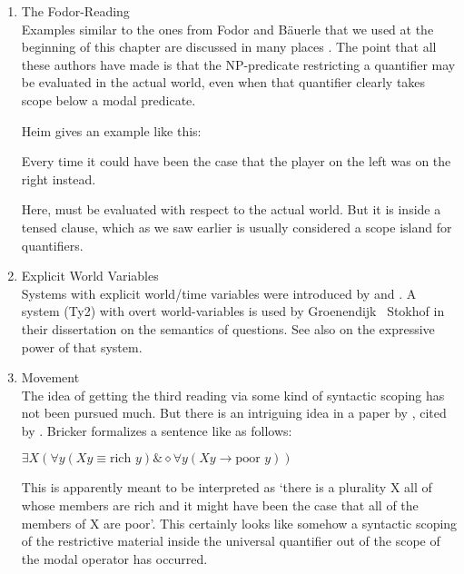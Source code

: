 \begin{enumerate}
  \medskip\item The Fodor-Reading\\[6pt]
  Examples similar to the ones from Fodor and Bäuerle that we used at the beginning of this chapter are discussed in many places \citep{ioup:specificity77, hellan:scope78, abusch:1994:indefinites, bonomi:transp95, farkas:scope97}. The point that all these authors have made is that the NP-predicate restricting a quantifier may be evaluated in the actual world, even when that quantifier clearly takes scope below a modal predicate.
  
  Heim \citep{heim:artikel} gives an example like this:
  
  \ex Every time it could have been the case that the player on the left was on the right instead. \xe
  
  Here,  must be evaluated with respect to the actual world. But it is inside a tensed clause, which \dash as we saw earlier \dash is usually considered a scope island for quantifiers.
  
  \medskip\item Explicit World Variables\\[6pt]
  Systems with explicit world/time variables were introduced by \citet{tichy:approach} and \citet{gallin:intensional}. A system (Ty2) with overt world-variables is used by Groenendijk \amp\ Stokhof in their dissertation on the semantics of questions. See also \citet{zimmermann:diss} on the expressive power of that system.
  
  \medskip\item Movement\\[6pt]
  The idea of getting the third reading via some kind of syntactic scoping has not been pursued much. But there is an intriguing idea in a paper by \citet{bricker:pluraldere:89}, cited by \citet[p. 76]{cresswell:entities}. Bricker formalizes a sentence like  as follows:
  
  \ex $\exists X(\forall y(Xy \equiv \mbox{rich } y) \& \diamond\forall y(Xy \rightarrow \mbox{poor }y))$ \xe
  
  This is apparently meant to be interpreted as `there is a plurality X all of whose members are rich and it might have been the case that all of the members of X are poor'. This certainly looks like somehow a syntactic scoping of the restrictive material inside the universal quantifier out of the scope of the modal operator has occurred.
\end{enumerate}

